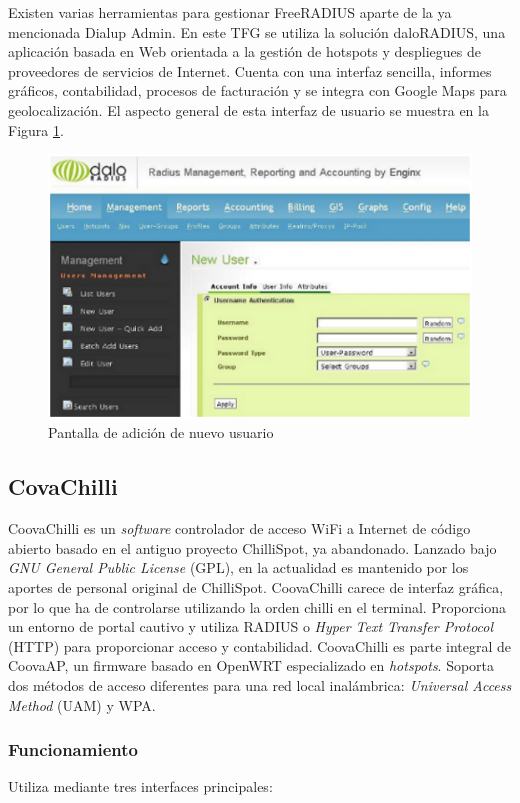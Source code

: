 Existen varias herramientas para gestionar FreeRADIUS aparte de la ya mencionada Dialup Admin. En este TFG se utiliza la solución daloRADIUS, una aplicación basada en Web orientada a la gestión de hotspots y despliegues de proveedores de servicios de Internet. Cuenta con una interfaz sencilla, informes gráficos, contabilidad, procesos de facturación y se integra con Google Maps para geolocalización. El aspecto general de esta interfaz de usuario se muestra en la Figura \ref{daloRADIUS1}.

\begin{figure}[!t]
\begin{center}
\includegraphics[width=0.75\linewidth]{./3_Tecnologias/Img/daloRADIUS1.png}
\end{center}
\caption{Pantalla de adición de nuevo usuario}
\label{daloRADIUS1}
\end{figure}

\subsection{CovaChilli}
CoovaChilli es un \emph{software} controlador de acceso WiFi a Internet de código abierto basado en el antiguo proyecto ChilliSpot, ya abandonado. Lanzado bajo \emph{GNU General Public License} (GPL), en la actualidad es mantenido por los aportes de personal original de ChilliSpot. CoovaChilli carece de interfaz gráfica, por lo que ha de controlarse utilizando la orden chilli en el terminal. Proporciona un entorno de portal cautivo y utiliza RADIUS o \emph{Hyper Text Transfer Protocol} (\acrshort{HTTP}) para proporcionar acceso y contabilidad. CoovaChilli es parte integral de CoovaAP, un firmware basado en OpenWRT especializado en \emph{hotspots}. Soporta dos métodos de acceso diferentes para una red local inalámbrica: \emph{Universal Access Method} (\acrshort{UAM}) y WPA.

\subsubsection{Funcionamiento}
Utiliza mediante tres interfaces principales:

